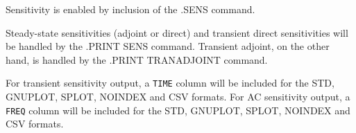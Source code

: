 

Sensitivity is enabled by inclusion of the \newline .SENS command.

Steady-state sensitivities (adjoint or direct) and transient direct sensitivities
will be handled by the .PRINT SENS command. Transient adjoint, on the other hand,
is handled by the .PRINT TRANADJOINT command.

For transient sensitivity output, a \texttt{TIME} column will be included for the
STD, GNUPLOT, SPLOT, NOINDEX and CSV formats.  For AC sensitivity output, a \texttt{FREQ}
column will be included for the STD, GNUPLOT, SPLOT, NOINDEX and CSV formats.

